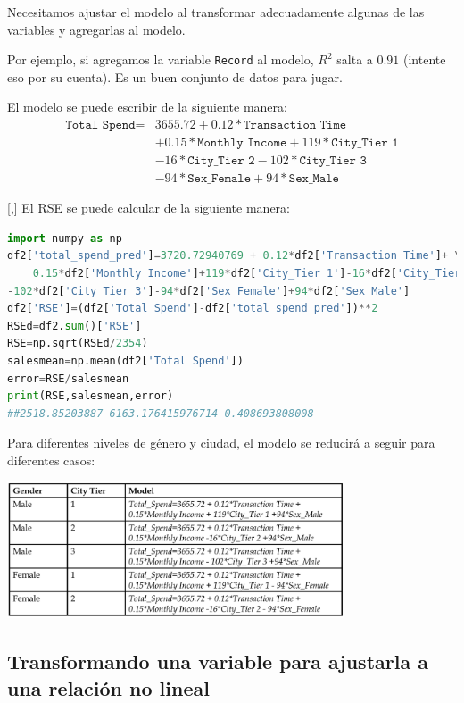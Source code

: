 Necesitamos ajustar el
modelo al transformar adecuadamente algunas de las variables y agregarlas al modelo. 

Por ejemplo, si agregamos la variable \texttt{Record} al modelo, $R^2$ salta a $0.91$ (intente eso
por su cuenta). Es un buen conjunto de datos para jugar.

El modelo se puede escribir de la siguiente manera:
\begin{align}
\texttt{Total\_Spend}= & 3655.72+0.12*\texttt{Transaction Time} \\ &+0.15*\texttt{Monthly Income}+119*\texttt{City\_Tier 1}\\
& -16*\texttt{City\_Tier 2} - 102*\texttt{City\_Tier 3}\\
& -94*\texttt{Sex\_Female}+94*\texttt{Sex\_Male}
\end{align}

[,]{}
El RSE se puede calcular de la siguiente manera:
\tiny
\begin{lstlisting}[language=Python]
import numpy as np
df2['total_spend_pred']=3720.72940769 + 0.12*df2['Transaction Time']+ \
    0.15*df2['Monthly Income']+119*df2['City_Tier 1']-16*df2['City_Tier 2']
-102*df2['City_Tier 3']-94*df2['Sex_Female']+94*df2['Sex_Male']
df2['RSE']=(df2['Total Spend']-df2['total_spend_pred'])**2
RSEd=df2.sum()['RSE']
RSE=np.sqrt(RSEd/2354)
salesmean=np.mean(df2['Total Spend'])
error=RSE/salesmean
print(RSE,salesmean,error)
##2518.85203887 6163.176415976714 0.408693808008
\end{lstlisting}


Para diferentes niveles de género y ciudad, el modelo se reducirá a seguir para
diferentes casos:
\begin{center}
 \includegraphics[width=10cm,keepaspectratio=true]{./images/dummies.png}
\end{center}



\subsection{Transformando una variable para ajustarla a una relación no lineal}

